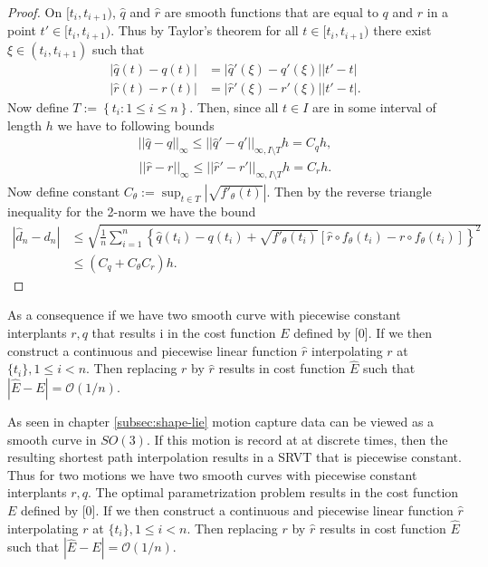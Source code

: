 \begin{proof}
  On  \([t_i, t_{i+1})\),  \(\hat q\) and  \(\hat r\) are smooth functions that are equal to  \(q\) and  \(r\) in a point  \(t' \in [t_i, t_{i+1})\). Thus by Taylor's theorem for all  \(t \in [t_i, t_{i+1})\) there exist  \(\xi \in (t_i, t_{i+1})\) such that
  \begin{eqnarray}
    |\hat q(t) - q(t)|  &= |\hat q'(\xi) - q'(\xi)||t' - t| \\
    |\hat r(t) - r(t)|  &= |\hat r'(\xi) - r'(\xi)||t' - t|.
  \end{eqnarray}
  Now define  \(T:= \left \{t_i : 1 \leq i \leq n \right \} \). Then, since all  \(t \in I\) are in some interval of length  \(h\) we have to following bounds
  \begin{eqnarray}
    ||\hat q - q||_{\infty} \leq ||\hat q' - q'||_{\infty, I \setminus T}h = C_q h,
  \end{eqnarray}
  \begin{eqnarray}
    ||\hat r - r||_{\infty} \leq ||\hat r' - r'||_{\infty, I \setminus T}h = C_r h.
  \end{eqnarray}
  Now define constant  \(C_{\theta}:= \sup_{t\in T} | \sqrt{f'_\theta(t)} | \). Then by the reverse triangle inequality for the 2-norm we have the bound
  \begin{align}
    |\hat d_n - d_n |
     & \leq \sqrt{\frac{1}{n}\sum_{i=1}^{n}\left\{\hat q(t_i) - q(t_i)  + \sqrt{f'_{\theta}(t_i)}\left[  \hat r \circ f_{\theta}(t_i) - r \circ f_{\theta}(t_i)\right]\right\}^2} \\
     & \leq \left(C_q  + C_{\theta} C_r \right)h.
  \end{align}
\end{proof}

As a consequence if we have two smooth curve with piecewise constant interplants \(r, q\) that results i in the cost function \(E\) defined by [0]. If we then construct a continuous and piecewise linear function \(\hat r\) interpolating \(r\) at \(\{t_i\}, 1 \leq i <n\). Then replacing \(r\) by \(\hat r\) results in cost function $\hat{E}$ such that \(|\hat{E} - E |= \mathcal{O}(1/n)\). 

As seen in chapter \ref{subsec:shape-lie} motion capture data can be viewed as a smooth curve in \(SO(3)\). If this motion is record at at discrete times, then the resulting shortest path interpolation results in a SRVT that is piecewise constant. Thus for two motions we have two smooth curves with piecewise constant interplants \(r, q\). The optimal parametrization problem results in the cost function \(E\) defined by [0]. If we then construct a continuous and piecewise linear function \(\hat r\) interpolating \(r\) at \(\{t_i\}, 1 \leq i <n\). Then replacing \(r\) by \(\hat r\) results in cost function $\hat{E}$ such that \(|\hat{E} - E |= \mathcal{O}(1/n)\). 
